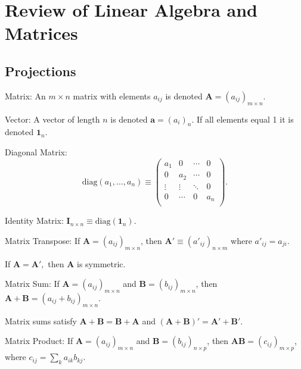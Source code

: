 \section{Review of Linear Algebra and Matrices}

\subsection{Projections}




















\bdefi
Matrix: An $m\times n$ matrix with elements $a_{ij}$ is denoted
$\mathbf{A}=(a_{ij})_{m\times n}$.
\esdefi

\bsdefi 
Vector: A vector of length $n$ is denoted $\mathbf a =(a_i)_n$.  If
all elements equal 1 it is denoted $\mathbf 1_n$.  
\esdefi

\vb

\bsdefi 
Diagonal Matrix:
$$\mathrm{diag}(a_1,\ldots,a_n) \equiv
\left( \begin{array}{cccc}
a_1 & 0 & \cdots & 0 \\ 
0 & a_2 & \cdots & 0 \\ 
\vdots & \vdots & \ddots & 0 \\ 
0 & \cdots & 0 & a_n \\ 
\end{array} \right).$$ 
\esdefi 

\bsdefi 
Identity Matrix: $\mathbf{I}_{n\times n} \equiv
\mathrm{diag}(\mathbf{1}_n)$.
\esdefi

\bsdefi 
Matrix Transpose: If $\mathbf{A}=(a_{ij})_{m\times n}$, then $\mathbf
A'\equiv(a'_{ij})_{n\times m}$ where $a'_{ij}=a_{ji}$.
\esdefi

\bsdefi 
If $\mathbf{A=A'},$ then $\mathbf A$ is symmetric.
\esdefi 

\bdefi 
Matrix Sum: If $\mathbf{A}=(a_{ij})_{m\times n}$ and $\mathbf{B} =
(b_{ij})_{m\times n}$, then $\mathbf{A + B} = (a_{ij} +
b_{ij})_{m\times n}.$
\esdefi 

\bstheo
Matrix sums satisfy $\mathbf{A + B = B + A}$ and $\mathbf{(A + B)' = A' + B'}.$
\estheo

\bdefi 
Matrix Product: If $\mathbf{A} = (a_{ij})_{m\times n}$ and $\mathbf{B}
= (b_{ij})_{n\times p}$, then $\mathbf{AB} = (c_{ij})_{m\times p}$,
where $c_{ij}=\sum_k a_{ik}b_{kj}.$
\esdefi

